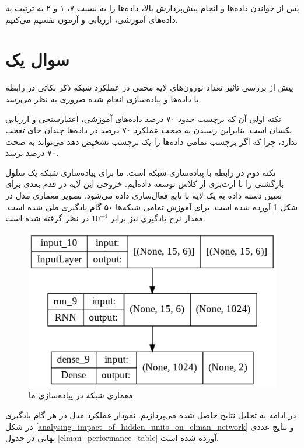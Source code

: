 \documentclass[12pt, a4paper]{article}
\begin{document}
پس از خواندن داده‌ها و انجام پیش‌پردازش بالا، داده‌ها را به نسبت ۷، ۱ و ۲ به ترتیب به داده‌های آموزشی،
ارزیابی و آزمون تقسیم می‌کنیم.

\clearpage

\section*{سوال یک}

پیش از بررسی تاثیر تعداد نورون‌های لایه مخفی در عملکرد شبکه  ذکر نکاتی در رابطه با داده‌ها و پیاده‌سازی
انجام شده ضروری به نظر می‌رسد.

نکته اولی آن که برچسب حدود ۷۰ درصد داده‌های آموزشی، اعتبارسنجی و ارزیابی یکسان است. بنابراین رسیدن به صحت
عملکرد ۷۰ درصد در داده‌ها چندان جای تعجب ندارد، چرا که اگر برچسب تمامی داده‌ها را یک برچسب تشخیص دهد
می‌تواند به صحت ۷۰ درصد برسد.

نکته دوم در رابطه با پیاده‌سازی شبکه  است. ما برای پیاده‌سازی شبکه  یک سلول بازگشتی را با ارث‌بری از
کلاس  توسعه داده‌ایم. خروجی این لایه در قدم بعدی برای تعیین دسته داده به یک لایه 
با تابع فعال‌سازی  داده می‌شود. تصویر معماری مدل در شکل \ref{elman_architecture} آورده شده است.
برای آموزش تمامی شبکه‌ها ۵۰ گام یادگیری طی شده است. مقدار نرخ یادگیری نیز برابر $10^{-4}$ در نظر گرفته شده است.

\begin{figure}[h]
    \centering
    \includegraphics[scale=0.5]{images/q1/elman/architecture.png}
    \caption{معماری شبکه  در پیاده‌سازی ما}
    \label{elman_architecture}
\end{figure}

در ادامه به تحلیل نتایج حاصل شده می‌پردازیم. نمودار عملکرد مدل در هر گام یادگیری در شکل
\ref{analysing_impact_of_hidden_units_on_elman_network} و نتایج عددی نهایی در جدول \ref{elman_performance_table}
آورده شده است.
\end{document}
